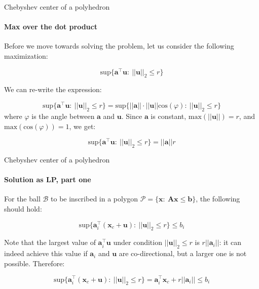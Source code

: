 \documentclass{beamer}
\begin{document}
\begin{frame}{Chebyshev center of a polyhedron}
	\framesubtitle{Max over the dot product}
	\begin{flushleft}
		
		Before we move towards solving the problem, let us consider the following maximization: 
		
		\begin{equation}
			\text{sup} \{ \mathbf{a}^\top \mathbf{u}: \ ||\mathbf{u}||_2 \leq r \}
		\end{equation}
	
	We can re-write the expression:
	
		\begin{equation}
			\text{sup} \{ \mathbf{a}^\top \mathbf{u}: \ ||\mathbf{u}||_2 \leq r \}  = 
			\text{sup} \{ ||\mathbf{a}|| \cdot ||\mathbf{u}|| \text{cos}(\varphi): \ ||\mathbf{u}||_2 \leq r \}
		\end{equation}
%	
where $\varphi$ is the angle between $\mathbf{a}$ and $\mathbf{u}$. Since $\mathbf{a}$ is constant, $\text{max}(||\mathbf{u}||) = r$, and $\text{max}(\text{cos}(\varphi)) = 1$, we get:
	
	\begin{equation}
		\text{sup} \{ \mathbf{a}^\top \mathbf{u}: \ ||\mathbf{u}||_2 \leq r \}  = 
		 ||\mathbf{a}|| r
	\end{equation}
	
		
	\end{flushleft}
\end{frame}




\begin{frame}{Chebyshev center of a polyhedron}
\framesubtitle{Solution as LP, part one}
\begin{flushleft}

For the ball $\mathcal{B}$ to be inscribed in a polygon $\mathcal{P} = \{ \mathbf{x}: \ \mathbf{A}\mathbf{x} \leq \mathbf{b} \}$, the following should hold:

\begin{equation}
    \text{sup} \{ \mathbf{a}_i^\top (\mathbf{x}_c + \mathbf{u}): \ ||\mathbf{u}||_2 \leq r \} \leq b_i
\end{equation}

Note that the largest value of $\mathbf{a}_i^\top \mathbf{u}$ under condition $||\mathbf{u}||_2 \leq r$ is $r ||\mathbf{a}_i||$: it can indeed achieve this value if $\mathbf{a}_i$ and $\mathbf{u}$ are co-directional, but a larger one is not possible. Therefore:

\begin{equation}
    \text{sup} \{ \mathbf{a}_i^\top (\mathbf{x}_c + \mathbf{u}): \ ||\mathbf{u}||_2 \leq r \}  = 
    \mathbf{a}_i^\top \mathbf{x}_c + r ||\mathbf{a}_i||
    \leq b_i
\end{equation}

 
\end{flushleft}
\end{frame}
\end{document}
